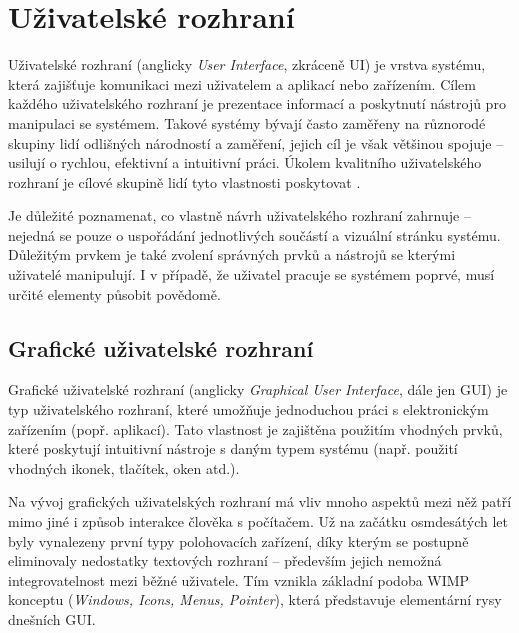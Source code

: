 \chapter{Uživatelské rozhraní}
\label{chap:ui}

Uživatelské rozhraní (anglicky \textit{User Interface}, zkráceně UI) je vrstva systému, která zajišťuje komunikaci mezi uživatelem a aplikací nebo zařízením. Cílem každého uživatelského rozhraní je prezentace informací a poskytnutí nástrojů pro manipulaci se systémem. Takové systémy bývají často zaměřeny na různorodé skupiny lidí odlišných národností a zaměření, jejich cíl je však většinou spojuje -- usilují o rychlou, efektivní a intuitivní práci. Úkolem kvalitního uživatelského rozhraní je cílové skupině lidí tyto vlastnosti poskytovat \cite{2}.

Je důležité poznamenat, co vlastně návrh uživatelského rozhraní zahrnuje -- nejedná se pouze o uspořádání jednotlivých součástí a vizuální stránku systému. Důležitým prvkem je také zvolení správných prvků a nástrojů se kterými uživatelé manipulují. I v případě, že uživatel pracuje se systémem poprvé, musí určité elementy působit povědomě.

\section{Grafické uživatelské rozhraní}
\label{sec:gui}

Grafické uživatelské rozhraní (anglicky \textit{Graphical User Interface}, dále jen GUI) je typ uživatelského rozhraní, které umožňuje jednoduchou práci s elektronickým zařízením (popř. aplikací). Tato vlastnost je zajištěna použitím vhodných prvků, které poskytují intuitivní nástroje s daným typem systému (např. použití vhodných ikonek, tlačítek, oken atd.).

Na vývoj grafických uživatelských rozhraní má vliv mnoho aspektů mezi něž patří mimo jiné i způsob interakce člověka s počítačem. Už na začátku osmdesátých let byly vynalezeny první typy polohovacích zařízení, díky kterým se postupně eliminovaly nedostatky textových rozhraní -- především jejich nemožná integrovatelnost mezi běžné uživatele. Tím vznikla základní podoba WIMP konceptu (\textit{Windows, Icons, Menus, Pointer}), která představuje elementární rysy dnešních GUI.

